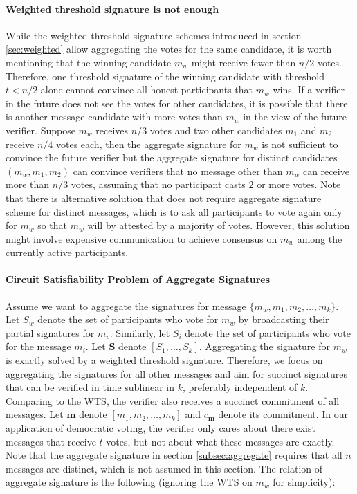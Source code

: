 \paragraph{Weighted threshold signature is not enough} While the weighted threshold signature schemes introduced in section \ref{sec:weighted} allow aggregating the votes for the same candidate, it is worth mentioning that the winning candidate $m_w$ might receive fewer than $n/2$ votes. Therefore, one threshold signature of the winning candidate with threshold $t<n/2$ alone cannot convince all honest participants that $m_w$ wins.  If a verifier in the future does not see the votes for other candidates, it is possible that there is another message candidate with more votes than $m_w$ in the view of the future verifier. Suppose $m_w$ receives $n/3$ votes and two other candidates $m_1$ and $m_2$ receive $n/4$ votes each, then the aggregate signature for $m_w$ is not sufficient to convince the future verifier but the aggregate signature for distinct candidates $(m_w, m_1, m_2)$ can convince verifiers that no message other than $m_w$ can receive more than $n/3$ votes, assuming that no participant casts $2$ or more votes. Note that there is alternative solution that does not require aggregate signature scheme for distinct messages, which is to ask all participants to vote again only for $m_w$ so that $m_w$ will by attested by a majority of votes. However, this solution might involve expensive communication to achieve consensus on $m_w$ among the currently active participants. 

\paragraph{Circuit Satisfiability Problem of Aggregate Signatures} Assume we want to aggregate the signatures for message $\{m_w, m_1, m_2,\dots, m_k\}$. Let $S_w$ denote the set of participants who vote for $m_w$ by broadcasting their partial signatures for $m_v$. Similarly, let $S_i$ denote the set of participants who vote for the message $m_i$. Let $\mathbf{S}$ denote $[S_1,\dots, S_k]$. Aggregating the signature for $m_w$ is exactly solved by a weighted threshold signature. Therefore, we focus on aggregating the signatures for all other messages and aim for succinct signatures that can be verified in time sublinear in $k$, preferably independent of $k$. Comparing to the WTS, the verifier also receives a succinct commitment of all messages. Let $\mathbf{m}$ denote $[m_1, m_2,\dots, m_k]$ and $c_{\mathbf{m}}$ denote its commitment. In our application of democratic voting, the verifier only cares about there exist messages that receive $t$ votes, but not about what these messages are exactly.  Note that the aggregate signature in section \ref{subsec:aggregate} requires that all $n$ messages are distinct, which is not assumed in this section. The relation of aggregate signature is the following (ignoring the WTS on $m_w$ for simplicity):

